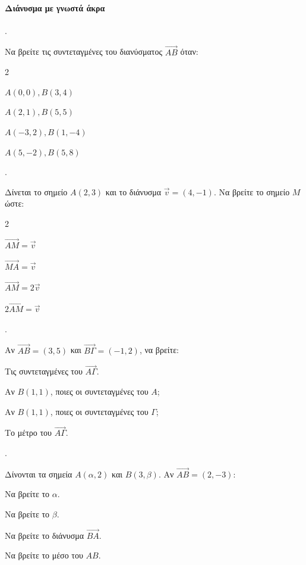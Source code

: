 \documentclass[11pt,a4paper,twocolumn]{article}
\newcounter{askhsh}
\newcommand{\askhsh}{\large\theaskhsh.\ \addtocounter{askhsh}{1}}
\begin{document}
\paragraph{Διάνυσμα με γνωστά άκρα}
\askhsh Να βρείτε τις συντεταγμένες του διανύσματος $\vec{AB}$ όταν:
\begin{multicols}{2}
\begin{alist}
    \item $A(0,0), B(3,4)$
    \item $A(2,1), B(5,5)$
    \item $A(-3,2), B(1,-4)$
    \item $A(5,-2), B(5,8)$
\end{alist}
\end{multicols}

\askhsh Δίνεται το σημείο $A(2,3)$ και το διάνυσμα $\vec{v}=(4,-1)$. Να βρείτε το σημείο $M$ ώστε:
\begin{multicols}{2}
\begin{alist}
    \item $\vec{AM} = \vec{v}$
    \item $\vec{MA} = \vec{v}$
    \item $\vec{AM} = 2\vec{v}$
    \item $2\vec{AM} = \vec{v}$
\end{alist}
\end{multicols}

\askhsh Αν $\vec{AB} = (3, 5)$ και $\vec{B\Gamma} = (-1, 2)$, να βρείτε:

\begin{alist}
    \item Τις συντεταγμένες του $\vec{A\Gamma}$.
    \item Αν $B(1,1)$, ποιες οι συντεταγμένες του $A$;
    \item Αν $B(1,1)$, ποιες οι συντεταγμένες του $\Gamma$;
    \item Το μέτρο του $\vec{A\Gamma}$.
\end{alist}


\askhsh Δίνονται τα σημεία $A(\alpha, 2)$ και $B(3, \beta)$. Αν $\vec{AB}=(2, -3)$:

\begin{alist}
    \item Να βρείτε το $\alpha$.
    \item Να βρείτε το $\beta$.
    \item Να βρείτε το διάνυσμα $\vec{BA}$.
    \item Να βρείτε το μέσο του $AB$.
\end{alist}
\end{document}
